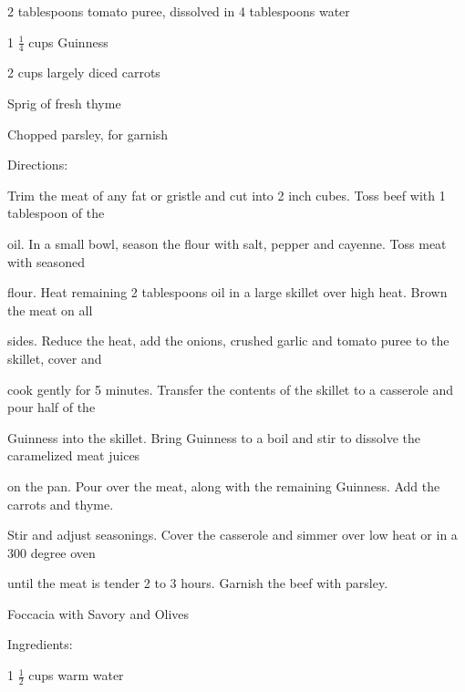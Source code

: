 \documentclass[a4paper,portrait,12pt]{book}
\begin{document}
2 tablespoons tomato puree, dissolved in 4 tablespoons water




1 $\frac{1}{4}$ cups Guinness




2 cups largely diced carrots




Sprig of fresh thyme




Chopped parsley, for garnish




Directions:




Trim the meat of any fat or gristle and cut into 2 inch cubes. Toss beef with 1 tablespoon of the




oil. In a small bowl, season the flour with salt, pepper and cayenne. Toss meat with seasoned




flour. Heat remaining 2 tablespoons oil in a large skillet over high heat. Brown the meat on all




sides. Reduce the heat, add the onions, crushed garlic and tomato puree to the skillet, cover and




cook gently for 5 minutes. Transfer the contents of the skillet to a casserole and pour half of the




Guinness into the skillet. Bring Guinness to a boil and stir to dissolve the caramelized meat juices




on the pan. Pour over the meat, along with the remaining Guinness. Add the carrots and thyme.




Stir and adjust seasonings. Cover the casserole and simmer over low heat or in a 300 degree oven




until the meat is tender 2 to 3 hours. Garnish the beef with parsley.







\newpage
Foccacia with Savory and Olives




Ingredients:




1 $\frac{1}{2}$ cups warm water
\end{document}
